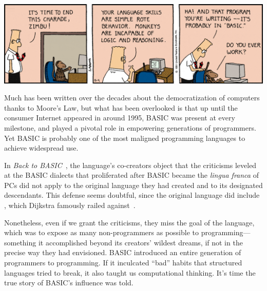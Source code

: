 

\includegraphics[width=\textwidth]{figs/dilbert-1991-12-04.png}



Much has been written over the decades about the democratization of
computers thanks to Moore's Law, but what has been overlooked is that up
until the consumer Internet appeared in around 1995, BASIC was present
at every milestone, and played a pivotal role in empowering generations
of programmers.
Yet BASIC is probably one of the most maligned programming languages
to achieve widespread use.

In \emph{Back to BASIC}~\cite{backtobasic}, the language's co-creators
object that the criticisms leveled at the 
BASIC dialects that proliferated after BASIC became the
\emph{lingua franca} of PCs did not apply to the original language
they had created and to its designated descendants.
This defense seems doubtful, since the original language did include
, which Dijkstra famously railed
against~\cite{goto_considered_harmful}.

Nonetheless, even if we grant the criticisms,
they miss the goal of the
language, which was to expose as many non-programmers as possible to
programming---something it accomplished beyond its creators' wildest dreams,
if not in the precise way they had envisioned.
BASIC introduced an entire generation of
programmers to programming.  If it inculcated ``bad'' habits that
structured languages tried to break,  it also taught us computational
thinking.    It's time the true story of BASIC's influence was told.

